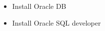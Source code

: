 \begin{flushleft}
	

	\begin{itemize}
		\item Install Oracle DB
		\item Install Oracle SQL developer
	\end{itemize}
	
\end{flushleft}

\newpage